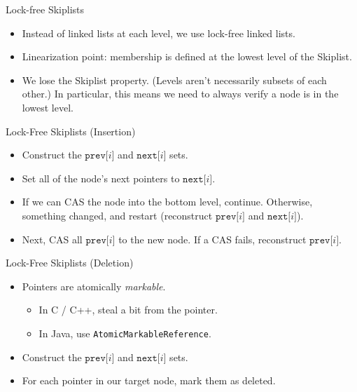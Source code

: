 \documentclass{beamer}
\begin{document}
\begin{frame}{Lock-free Skiplists}
  \begin{itemize}
    \item Instead of linked lists at each level, we use lock-free linked lists.
    \item Linearization point: membership is defined at the lowest level of the Skiplist.
    \item We lose the Skiplist property. (Levels aren't necessarily subsets of each other.) In particular,
      this means we need to always verify a node is in the lowest level.
  \end{itemize}
\end{frame}

\begin{frame}{Lock-Free Skiplists (Insertion)}
  \begin{itemize}
    \item Construct the $\mathtt{prev[}i\mathtt{]}$ and $\mathtt{next[}i\mathtt{]}$ sets.
    \item Set all of the node's next pointers to $\mathtt{next[}i\mathtt{]}$.
    \item If we can CAS the node into the bottom level, continue. Otherwise, something changed, and
      restart (reconstruct $\mathtt{prev[}i\mathtt{]}$ and $\mathtt{next[}i\mathtt{]}$).
    \item Next, CAS all $\mathtt{prev[}i\mathtt{]}$ to the new node. If a CAS fails, reconstruct
      $\mathtt{prev[}i\mathtt{]}$.
  \end{itemize}
\end{frame}

\begin{frame}{Lock-Free Skiplists (Deletion)}
  \begin{itemize}
    \item Pointers are atomically \textit{markable}.
      \begin{itemize}
        \item In C / C++, steal a bit from the pointer.
        \item In Java, use \texttt{AtomicMarkableReference}.
      \end{itemize}
    \item Construct the $\mathtt{prev[}i\mathtt{]}$ and $\mathtt{next[}i\mathtt{]}$ sets.
    \item For each pointer in our target node, mark them as deleted.
  \end{itemize}
\end{frame}
\end{document}
